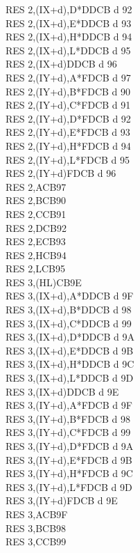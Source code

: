 \documentclass[oneside,a4paper]{book}
\begin{document}
\begin{multicols}{3}
{\begin{tabbing}
RES 2,(IX+d),D*\>DDCB d 92\\
RES 2,(IX+d),E*\>DDCB d 93\\
RES 2,(IX+d),H*\>DDCB d 94\\
RES 2,(IX+d),L*\>DDCB d 95\\
RES 2,(IX+d)\>DDCB d 96\\
RES 2,(IY+d),A*\>FDCB d 97\\
RES 2,(IY+d),B*\>FDCB d 90\\
RES 2,(IY+d),C*\>FDCB d 91\\
RES 2,(IY+d),D*\>FDCB d 92\\
RES 2,(IY+d),E*\>FDCB d 93\\
RES 2,(IY+d),H*\>FDCB d 94\\
RES 2,(IY+d),L*\>FDCB d 95\\
RES 2,(IY+d)\>FDCB d 96\\
RES 2,A\>CB97\\
RES 2,B\>CB90\\
RES 2,C\>CB91\\
RES 2,D\>CB92\\
RES 2,E\>CB93\\
RES 2,H\>CB94\\
RES 2,L\>CB95\\
RES 3,(HL)\>CB9E\\
RES 3,(IX+d),A*\>DDCB d 9F\\
RES 3,(IX+d),B*\>DDCB d 98\\
RES 3,(IX+d),C*\>DDCB d 99\\
RES 3,(IX+d),D*\>DDCB d 9A\\
RES 3,(IX+d),E*\>DDCB d 9B\\
RES 3,(IX+d),H*\>DDCB d 9C\\
RES 3,(IX+d),L*\>DDCB d 9D\\
RES 3,(IX+d)\>DDCB d 9E\\
RES 3,(IY+d),A*\>FDCB d 9F\\
RES 3,(IY+d),B*\>FDCB d 98\\
RES 3,(IY+d),C*\>FDCB d 99\\
RES 3,(IY+d),D*\>FDCB d 9A\\
RES 3,(IY+d),E*\>FDCB d 9B\\
RES 3,(IY+d),H*\>FDCB d 9C\\
RES 3,(IY+d),L*\>FDCB d 9D\\
RES 3,(IY+d)\>FDCB d 9E\\
RES 3,A\>CB9F\\
RES 3,B\>CB98\\
RES 3,C\>CB99\\

\end{tabbing}}
\end{multicols}
\end{document}
